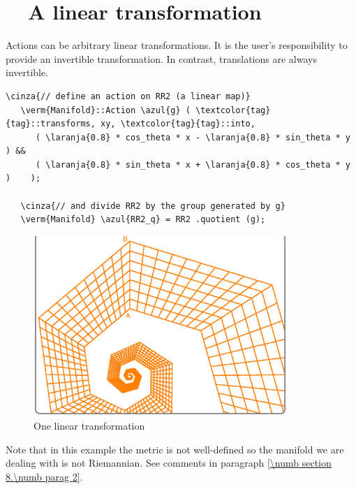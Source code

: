 \section{~~A linear transformation}\label{\numb section 7.\numb parag 17}

Actions can be arbitrary linear transformations.
It is the user's responsibility to provide an invertible transformation.
In contrast, translations are always invertible.

\begin{Verbatim}[commandchars=\\\{\},formatcom=\small\tt,frame=single,
   label=parag-\ref{\numb section 7.\numb parag 17}.cpp,rulecolor=\color{moldura},
   baselinestretch=0.94,framesep=2mm                                             ]
   \cinza{// define an action on RR2 (a linear map)}
   \verm{Manifold}::Action \azul{g} ( \textcolor{tag}{tag}::transforms, xy, \textcolor{tag}{tag}::into,
      ( \laranja{0.8} * cos_theta * x - \laranja{0.8} * sin_theta * y ) &&
      ( \laranja{0.8} * sin_theta * x + \laranja{0.8} * cos_theta * y )    );

   \cinza{// and divide RR2 by the group generated by g}
   \verm{Manifold} \azul{RR2_q} = RR2 .quotient (g);
\end{Verbatim}

\begin{figure}[ht] \centering
  \includegraphics[width=96mm]{sector-2.eps}
  \caption{One linear transformation}
  \label{\numb section 7.\numb fig 13}
\end{figure}

Note that in this example the metric is not well-defined
so the manifold we are dealing with is not Riemannian.
See comments in paragraph \ref{\numb section 8.\numb parag 2}.



